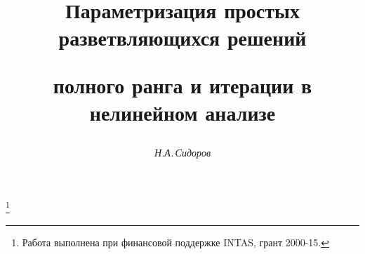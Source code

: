 




% 




\newcommand{\la}{\langle}


\newcommand{\ra}{\rangle}


\newcommand{\supp}{\operatorname{supp}}


\newcommand{\tts}[1]{}







\setcounter{page}{59}















\author{\it Н.А.\,Сидоров}




\title{Параметризация простых разветвляющихся решений


полного ранга и итерации в нелинейном анализе}


\thanks{Работа выполнена при финансовой поддержке INTAS, грант 2000-15.}





\date{}




\pagestyle{plain} %







\maketitle


